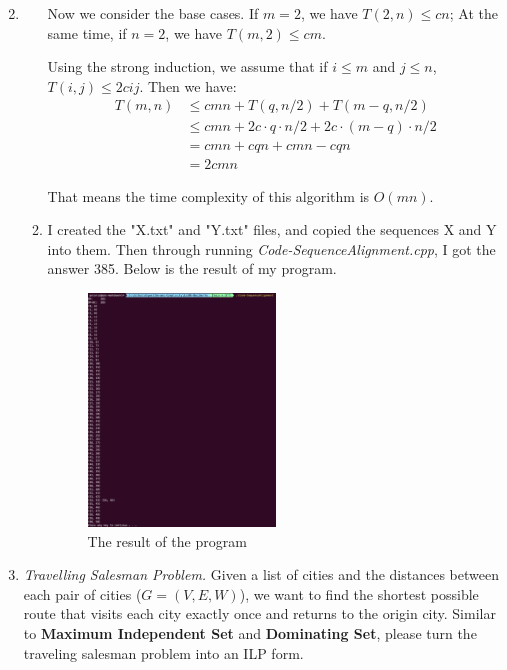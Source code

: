 \documentclass[12pt,a4paper]{article}
\makeatletter
\newtheorem*{solution}{Solution}
\theoremstyle{definition}
\renewenvironment{solution}[1][Solution] {\par\pushQED{\qed}\normalfont\topsep6\p@\@plus6\p@\relax\trivlist\item[\hskip\labelsep\bfseries#1\@addpunct{.}]\ignorespaces}{\popQED\endtrivlist\@endpefalse} \makeatother
\makeatother
\begin{document}
\begin{enumerate}
\begin{solution}
\begin{enumerate}
    Now we consider the base cases. If $m = 2$, we have $T(2,n) \leqslant cn$; At the same time, if $n = 2$, we have $T(m,2) \leqslant cm$. 
    
    Using the strong induction, we assume that if $i \leqslant m$ and $j \leqslant n$, $T(i,j) \leqslant 2cij$. Then we have:
   	\begin{align*}
   	T(m,n) &\leqslant cmn + T(q,n/2) + T(m-q,n/2)\\
   	&\leqslant cmn + 2c \cdot q \cdot n/2 + 2c \cdot (m-q) \cdot n/2 \\
   	&= cmn + cqn + cmn - cqn\\
   	&= 2cmn
   	\end{align*}
   	
   	That means the time complexity of this algorithm is $O(mn)$.
   	
   	\item
   	
    I created the "X.txt" and "Y.txt" files, and copied the sequences X and Y into them. Then through running \emph{Code-SequenceAlignment.cpp}, I got the answer 385. Below is the result of my program.
   	\begin{figure}[H]
    \centering
    \includegraphics[width=0.5\textwidth]{sequence.png}
    \caption{The result of the program}
\end{figure}
    \end{enumerate}
    \end{solution}
    
    
    
    \item 
    \textit{Travelling Salesman Problem.} Given a list of cities and the distances between each pair of cities ($ G=(V,E,W) $), we want to find the shortest possible route that visits each city exactly once and returns to the origin city. Similar to \textbf{Maximum Independent Set} and \textbf{Dominating Set}, please turn the traveling salesman problem into an ILP form.  
    

\end{enumerate}
\end{document}
